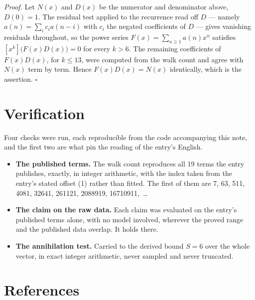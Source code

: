 \documentclass[11pt]{article}
\theoremstyle{definition}
\begin{document}
{\itshape Proof.} Let $N(x)$ and $D(x)$ be the numerator and denominator above, $D(0)=1$. The residual test applied to the recurrence read off $D$ --- namely $a(n) = \sum_i c_i a(n-i)$ with $c_i$ the negated coefficients of $D$ --- gives vanishing residuals throughout, so the power series $F(x)=\sum_{n\ge 1}a(n)x^n$ satisfies $[x^k]\bigl(F(x)D(x)\bigr) = 0$ for every $k > 6$. The remaining coefficients of $F(x)D(x)$, for $k \le 13$, were computed from the walk count and agree with $N(x)$ term by term. Hence $F(x)D(x) = N(x)$ identically, which is the assertion. $\square$

\section{Verification}

Four checks were run, each reproducible from the code accompanying this note, and the first two are what pin the reading of the entry's English.

\begin{itemize}

\item {\bfseries The published terms.} The walk count reproduces all 19 terms the entry publishes, exactly, in integer arithmetic, with the index taken from the entry's stated offset (1) rather than fitted. The first of them are 7, 63, 511, 4081, 32641, 261121, 2088919, 16710911,~\dots

\item {\bfseries The claim on the raw data.} Each claim was evaluated on the entry's published terms alone, with no model involved, wherever the proved range and the published data overlap. It holds there.

\item {\bfseries The annihilation test.} Carried to the derived bound $S = 6$ over the whole vector, in exact integer arithmetic, never sampled and never truncated.

\end{itemize}

\section{References}
\end{document}
